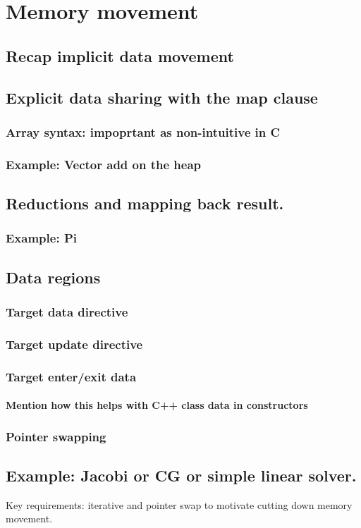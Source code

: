 

\chapter{Memory movement}

\section{Recap implicit data movement}
\section{Explicit data sharing with the map clause}
\subsection{Array syntax: impoprtant as non-intuitive in C}

\subsection{Example: Vector add on the heap}

\section{Reductions and mapping back result.}
\subsection{Example: Pi}

\section{Data regions}
\subsection{Target data directive}
\subsection{Target update directive}
\subsection{Target enter/exit data}
\subsubsection{Mention how this helps with C++ class data in constructors}

\subsection{Pointer swapping}

\section{Example: Jacobi or CG or simple linear solver.}
Key requirements: iterative and pointer swap to motivate cutting down memory movement.

